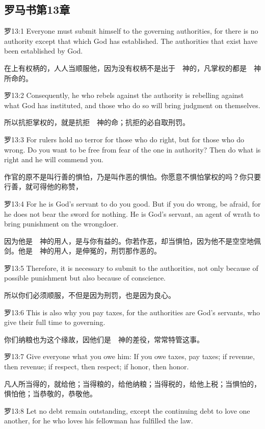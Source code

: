 \documentclass[a4paper,11pt,onecolumn,twoside]{ctexart}
\begin{document}
\begin{multicols}{2}
\section{ 罗马书第13章}
 罗13:1
 Everyone must submit himself to the governing authorities, for there is no authority except that which God has established. The authorities that exist have been established by God.

 在上有权柄的，人人当顺服他，因为没有权柄不是出于　神的，凡掌权的都是　神所命的。


 罗13:2
 Consequently, he who rebels against the authority is rebelling against what God has instituted, and those who do so will bring judgment on themselves.

 所以抗拒掌权的，就是抗拒　神的命；抗拒的必自取刑罚。


 罗13:3
 For rulers hold no terror for those who do right, but for those who do wrong. Do you want to be free from fear of the one in authority? Then do what is right and he will commend you.

 作官的原不是叫行善的惧怕，乃是叫作恶的惧怕。你愿意不惧怕掌权的吗？你只要行善，就可得他的称赞，


 罗13:4
 For he is God's servant to do you good. But if you do wrong, be afraid, for he does not bear the sword for nothing. He is God's servant, an agent of wrath to bring punishment on the wrongdoer.

 因为他是　神的用人，是与你有益的。你若作恶，却当惧怕，因为他不是空空地佩剑。他是　神的用人，是伸冤的，刑罚那作恶的。


 罗13:5
 Therefore, it is necessary to submit to the authorities, not only because of possible punishment but also because of conscience.

 所以你们必须顺服，不但是因为刑罚，也是因为良心。


 罗13:6
 This is also why you pay taxes, for the authorities are God's servants, who give their full time to governing.

 你们纳粮也为这个缘故，因他们是　神的差役，常常特管这事。


 罗13:7
 Give everyone what you owe him: If you owe taxes, pay taxes; if revenue, then revenue; if respect, then respect; if honor, then honor.

 凡人所当得的，就给他；当得粮的，给他纳粮；当得税的，给他上税；当惧怕的，惧怕他；当恭敬的，恭敬他。


 罗13:8
 Let no debt remain outstanding, except the continuing debt to love one another, for he who loves his fellowman has fulfilled the law.


\end{multicols}
\end{document}
